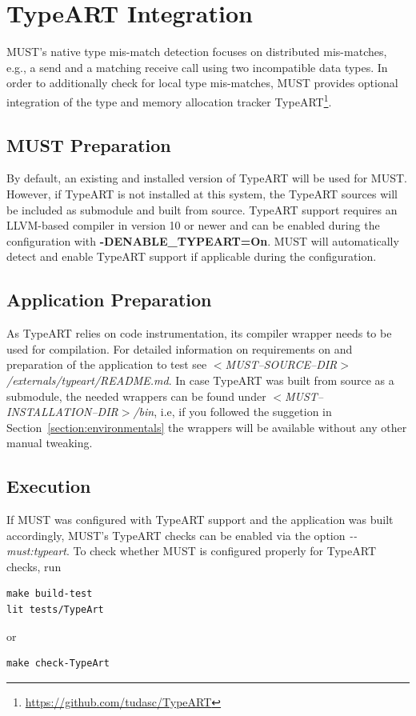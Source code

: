 \documentclass[english]{scrartcl}
\begin{document}
\section{TypeART Integration}
\label{section:typeart}
MUST's native type mis-match detection focuses on distributed mis-matches, e.g., a send and a matching receive call using two incompatible data types. 
In order to additionally check for local type mis-matches, MUST provides optional integration of the type and memory allocation tracker TypeART\footnote{\url{https://github.com/tudasc/TypeART}}.

\subsection{MUST Preparation}
By default, an existing and installed version of TypeART will be used for MUST.
However, if TypeART is not installed at this system, the TypeART sources will be included as submodule and built from source.
TypeART support requires an LLVM-based compiler in version 10 or newer and can be enabled during the configuration with \textbf{\mbox{-DENABLE\_TYPEART=On}}.
MUST will automatically detect and enable TypeART support if applicable during the configuration.

\subsection{Application Preparation}
As TypeART relies on code instrumentation, its compiler wrapper needs to be used for compilation.
For detailed information on requirements on and preparation of the application to test see \emph{$<$MUST\mbox{--}SOURCE\mbox{--}DIR$>$/externals/typeart/README.md}.
In case TypeART was built from source as a submodule, the needed wrappers can be found under \emph{$<$MUST\mbox{--}INSTALLATION\mbox{--}DIR$>$/bin}, i.e,
if you followed the suggetion in Section~\ref{section:environmentals} the wrappers will be available without any other manual tweaking.

\subsection{Execution}
If MUST was configured with TypeART support and the application was built accordingly, MUST's TypeART checks can be enabled via the option \emph{\mbox{-{}-must:typeart}}.
To check whether MUST is configured properly for TypeART checks, run
\begin{verbatim}
make build-test
lit tests/TypeArt
\end{verbatim}
or
\begin{verbatim}
make check-TypeArt
\end{verbatim}
\end{document}
